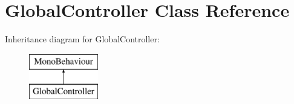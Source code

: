 \hypertarget{class_global_controller}{}\section{Global\+Controller Class Reference}
\label{class_global_controller}
Inheritance diagram for Global\+Controller\+:\begin{figure}[H]
\begin{center}
\leavevmode
\includegraphics[height=2.000000cm]{class_global_controller}
\end{center}
\end{figure}
